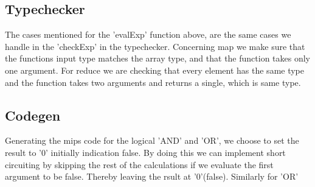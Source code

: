 \documentclass[12pt]{article}
\numberwithin{listing}{section}
\begin{document}
\subsection*{Typechecker}
The cases mentioned for the 'evalExp' function above, are the same cases we handle in the 'checkExp' in the typechecker. 
Concerning map we make sure that the functions input type matches the array type, and that the function takes only one argument. 
For reduce we are checking that every element has the same type and the function takes two arguments and returns a single, which is same type.
\newpage

\subsection*{Codegen}
Generating the mips code for the logical ’AND’ and ’OR’, we choose to set the result to
’0’ initially indication false. By doing this we can implement short circuiting by skipping
the rest of the calculations if we evaluate the first argument to be false. Thereby leaving
the rsult at ’0’(false). Similarly for ’OR’\\
\end{document}
